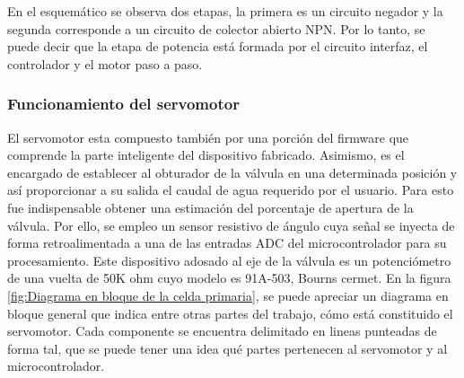 En el esquemático se observa dos etapas, la primera es un circuito negador y la segunda corresponde a un circuito de colector abierto NPN.
Por lo tanto, se puede decir que la etapa de potencia está formada por el circuito interfaz, el controlador y el motor paso a paso. 
\vspace{2cm}
\subsubsection{Funcionamiento del servomotor}
 
El servomotor esta compuesto también por una porción del firmware que comprende la parte inteligente del dispositivo fabricado.
Asimismo, es el encargado de establecer al obturador de la válvula en una determinada posición y así proporcionar a su salida el caudal de agua requerido por el usuario. 
Para esto fue indispensable obtener una estimación del porcentaje de apertura de la válvula. Por ello, se empleo un sensor resistivo de ángulo cuya señal se inyecta de forma retroalimentada a una de las entradas ADC del microcontrolador para su procesamiento. Este dispositivo adosado al eje de la válvula es un potenciómetro de una vuelta de 50K ohm cuyo modelo es 91A-503, Bourns cermet.
En la figura \ref{fig:Diagrama en bloque de la celda primaria}, se puede apreciar un diagrama en bloque general que indica entre otras partes del trabajo, cómo está constituido el servomotor. Cada componente se encuentra delimitado en lineas punteadas de forma tal, que se puede tener una idea qué partes pertenecen al servomotor y al microcontrolador.   
   

